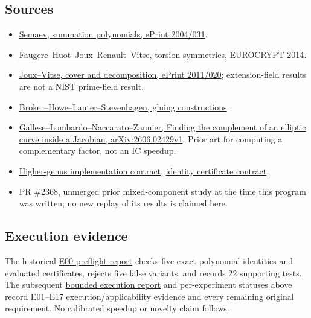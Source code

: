 \documentclass[
  10pt,
]{article}
\providecommand{\tightlist}{%
  \setlength{\itemsep}{0pt}\setlength{\parskip}{0pt}}
\begin{document}
\subsection{Sources}\label{sources}

\begin{itemize}
\tightlist
\item
  \href{https://eprint.iacr.org/2004/031}{Semaev, summation polynomials,
  ePrint 2004/031}.
\item
  \href{https://www.iacr.org/archive/eurocrypt2014/84410158/84410158.pdf}{Faugere--Huot--Joux--Renault--Vitse,
  torsion symmetries, EUROCRYPT 2014}.
\item
  \href{https://eprint.iacr.org/2011/020}{Joux--Vitse, cover and
  decomposition, ePrint 2011/020}; extension-field results are not a
  NIST prime-field result.
\item
  \href{https://arxiv.org/abs/1403.6911}{Broker--Howe--Lauter--Stevenhagen,
  gluing constructions}.
\item
  \href{https://arxiv.org/abs/2606.02429}{Gallese--Lombardo--Naccarato--Zannier,
  Finding the complement of an elliptic curve inside a Jacobian,
  arXiv:2606.02429v1}. Prior art for computing a complementary factor,
  not an IC speedup.
\item
  \href{../../.agents/skills/ecdlp-surfaces/references/higher-genus.md}{Higher-genus
  implementation contract},
  \href{../../docs/identity-certificates/README.md}{identity certificate
  contract}.
\item
  \href{https://github.com/aburan28/crypto/pull/2368}{PR \#2368},
  unmerged prior mixed-component study at the time this program was
  written; no new replay of its results is claimed here.
\end{itemize}

\subsection{Execution evidence}\label{execution-evidence}

The historical \href{reports/RESULTS.md}{E00 preflight report} checks
five exact polynomial identities and evaluated certificates, rejects
five false variants, and records 22 supporting tests. The subsequent
\href{reports/EXECUTION_RESULTS.md}{bounded execution report} and
per-experiment statuses above record E01--E17 execution/applicability
evidence and every remaining original requirement. No calibrated speedup
or novelty claim follows.
\end{document}
